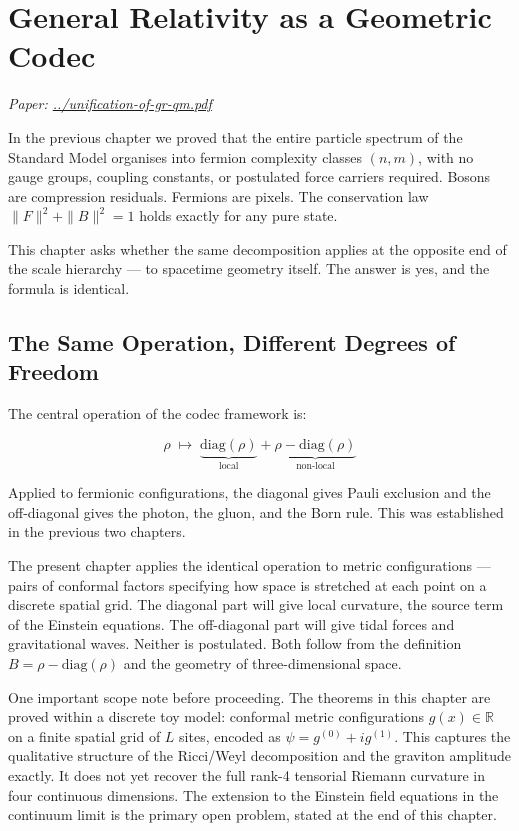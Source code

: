 \chapter{General Relativity as a Geometric Codec}

\textit{Paper: \url{../unification-of-gr-qm.pdf}}

In the previous chapter we proved that the entire particle spectrum of
the Standard Model organises into fermion complexity classes $(n, m)$,
with no gauge groups, coupling constants, or postulated force carriers
required. Bosons are compression residuals. Fermions are pixels. The
conservation law $\|F\|^2 + \|B\|^2 = 1$ holds exactly for any pure
state.

This chapter asks whether the same decomposition applies at the
opposite end of the scale hierarchy --- to spacetime geometry itself.
The answer is yes, and the formula is identical.

\section{The Same Operation, Different Degrees of Freedom}

The central operation of the codec framework is:

\[
\rho \;\longmapsto\;
\underbrace{\mathrm{diag}(\rho)}_{\text{local}}
+
\underbrace{\rho - \mathrm{diag}(\rho)}_{\text{non-local}}
\]

Applied to fermionic configurations, the diagonal gives Pauli
exclusion and the off-diagonal gives the photon, the gluon, and the
Born rule. This was established in the previous two chapters.

The present chapter applies the identical operation to metric
configurations --- pairs of conformal factors specifying how space is
stretched at each point on a discrete spatial grid. The diagonal part
will give local curvature, the source term of the Einstein equations.
The off-diagonal part will give tidal forces and gravitational waves.
Neither is postulated. Both follow from the definition
$B = \rho - \mathrm{diag}(\rho)$ and the geometry of three-dimensional
space.

One important scope note before proceeding. The theorems in this
chapter are proved within a discrete toy model: conformal metric
configurations $g(x) \in \mathbb{R}$ on a finite spatial grid of $L$
sites, encoded as $\psi = g^{(0)} + ig^{(1)}$. This captures the
qualitative structure of the Ricci/Weyl decomposition and the graviton
amplitude exactly. It does not yet recover the full rank-4 tensorial
Riemann curvature in four continuous dimensions. The extension to the
Einstein field equations in the continuum limit is the primary open
problem, stated at the end of this chapter.


